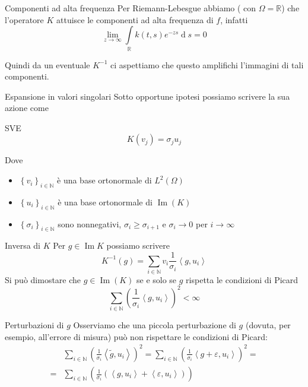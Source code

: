 \documentclass{beamer}
\theoremstyle{plain}
\theoremstyle{definition}
\theoremstyle{remark}
\newcommand{\set}[1]{\left\{#1\right\}}
\newcommand{\pa}[1]{\left(#1\right)}
\newcommand{\ang}[1]{\left<#1\right>}
\newcommand{\intl}{\int \limits}
\DeclareMathOperator{\de}{d}
\DeclareMathOperator{\im}{Im}
\begin{document}
\begin{frame}{Componenti ad alta frequenza}
  Per Riemann-Lebesgue abbiamo ( con $\Omega = \mathbb{R}$) che
  l'operatore $K$ attuisce le componenti ad alta frequenza di $f$,
  infatti
  \[ \lim _{z \to \infty} \intl _\mathbb{R} k(t,s) e^{-zs} \de s =
  0 \]

  Quindi da un eventuale $K^{-1}$ ci aspettiamo che questo amplifichi
  l'immagini di tali componenti.
\end{frame}

\begin{frame}{Espansione in valori singolari}
  Sotto opportune ipotesi possiamo scrivere la sua azione come
  \begin{block}{SVE}
    \[ K(v_j) = \sigma _j u_j \]
  \end{block}
  Dove
  \begin{itemize}
  \item $\set{v_i}_{i\in \mathbb{N}}$ è una base ortonormale di
    $L^2(\Omega)$
  \item $\set{u_i}_{i\in \mathbb{N}}$ è una base ortonormale di
    $\im(K)$
  \item $\set{\sigma _i}_{i\in \mathbb{N}}$ sono nonnegativi, $\sigma
    _i \ge \sigma _{i+1}$ e $\sigma _i \to 0$ per $i \to \infty$
  \end{itemize}
\end{frame}

\begin{frame}{Inversa di $K$}
  Per $g \in \im{K}$ possiamo scrivere
  \[ K^{-1}(g) = \sum _{i\in \mathbb{N}} v_i \frac{1}{\sigma _i}
  \ang{g,u_i} \]
  \vfill
  Si può dimostare che $g\in \im (K)$ se e solo se $g$ rispetta le
  condizioni di Picard
  \[ \sum _{i\in \mathbb{N}} \pa{ \frac{1}{\sigma _i} \ang{g,u_i}} ^2
  < \infty \]
\end{frame}

\begin{frame}{Perturbazioni di $g$}
  Osserviamo che una piccola perturbazione di $g$ (dovuta, per
  esempio, all'errore di misura) può non rispettare le condizioni di
  Picard:
  \begin{align*}
    & \sum _{i\in \mathbb{N}} \pa{ \frac{1}{\sigma _i} \ang{\tilde
        g,u_i}} ^2 = \sum _{i\in \mathbb{N}} \pa{ \frac{1}{\sigma _i}
      \ang{g + \varepsilon,u_i}} ^2 = \\
    = & \sum _{i\in \mathbb{N}} \pa{ \frac{1}{\sigma _i}        
      \pa{ \ang{g, u_i} + \ang{ \varepsilon, u_i } } }
  \end{align*}
\end{frame}
\end{document}
